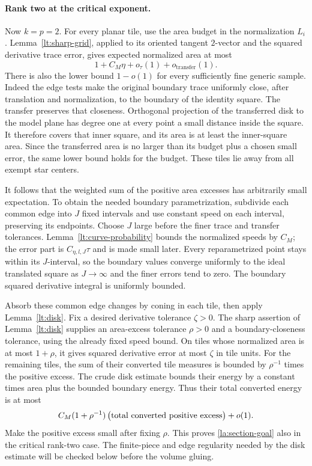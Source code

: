 \documentclass[11pt]{article}
\numberwithin{equation}{section}
\theoremstyle{definition}
\theoremstyle{remark}
\begin{document}
\paragraph{Rank two at the critical exponent.}
Now $k=p=2$.  For every planar tile, use the area budget in the
normalization $L_i$.  Lemma~\ref{lt:sharp-grid}, applied to its
oriented tangent $2$-vector and the squared derivative trace error,
gives expected normalized area at most
\begin{equation}\label{la:sharp-area-budget}
 1+C_M\eta+o_\tau(1)+o_{\mathrm{transfer}}(1).
\end{equation}
There is also the lower bound $1-o(1)$ for every sufficiently fine
generic sample.  Indeed the edge tests make the original boundary
trace uniformly close, after translation and normalization, to the
boundary of the identity square.  The transfer preserves that
closeness.  Orthogonal projection of the transferred disk to the
model plane has degree one at every point a small distance inside
the square.  It therefore covers that inner square, and its area is
at least the inner-square area.  Since the transferred area is no
larger than its budget plus a chosen small error, the same lower
bound holds for the budget.  These tiles lie away from all exempt
star centers.

It follows that the weighted sum of the positive area excesses has
arbitrarily small expectation.  To obtain the needed boundary
parametrization, subdivide each common edge into $J$ fixed intervals
and use constant speed on each interval, preserving its endpoints.
Choose $J$ large before the finer trace and transfer tolerances.
Lemma~\ref{lt:curve-probability} bounds the normalized speeds by
$C_M$; the error part is $C_{\eta,l,J}\tau$ and is made small later.
Every reparametrized point stays within its $J$-interval, so the
boundary values converge uniformly to the ideal translated square
as $J\to\infty$ and the finer errors tend to zero.  The boundary
squared derivative integral is uniformly bounded.

Absorb these common edge changes by coning in each tile, then apply
Lemma~\ref{lt:disk}.  Fix a desired derivative tolerance $\zeta>0$.
The sharp assertion of Lemma~\ref{lt:disk} supplies an area-excess tolerance
$\rho>0$ and a boundary-closeness tolerance, using the already fixed
speed bound.  On tiles whose normalized area is at most $1+\rho$,
it gives squared derivative error at most $\zeta$ in tile units.
For the remaining tiles, the sum of their converted tile measures
is bounded by $\rho^{-1}$ times the positive excess.  The crude disk
estimate bounds their energy by a constant times area plus the
bounded boundary energy.  Thus their total converted energy is at
most
\[
 C_M(1+\rho^{-1})\,
       \bigl(\hbox{total converted positive excess}\bigr)
       +o(1).
\]
Make the positive excess small after fixing $\rho$.  This proves
\eqref{la:section-goal} also in the critical rank-two case.  The
finite-piece and edge regularity needed by the disk estimate will
be checked below before the volume gluing.
\end{document}
